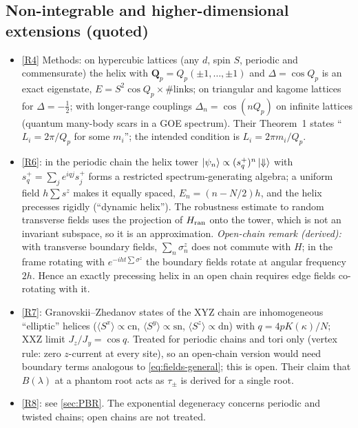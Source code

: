 \documentclass[11pt,a4paper]{article}
\theoremstyle{definition}
\begin{document}
\subsection{Non-integrable and higher-dimensional extensions (quoted)}
\begin{itemize}
\item \ref{R4} Methods: on hypercubic lattices (any $d$, spin $S$, periodic and commensurate) the helix with $\mathbf Q_p=Q_p(\pm1,\dots,\pm1)$ and $\Delta=\cos Q_p$ is an exact eigenstate, $E=S^2\cos Q_p\times\#\text{links}$; on triangular and kagome lattices for $\Delta=-\frac12$; with longer-range couplings $\Delta_n=\cos(nQ_p)$ on infinite lattices (quantum many-body scars in a GOE spectrum). Their Theorem~1 states ``$L_i=2\pi/Q_p$ for some $m_i$''; the intended condition is $L_i=2\pi m_i/Q_p$.
\item \ref{R6}: in the periodic chain the helix tower $\ket{\psi_n}\propto(s_q^+)^n\ket\Downarrow$ with $s^+_q=\sum_je^{iqj}s^+_j$ forms a restricted spectrum-generating algebra; a uniform field $h\sum s^z$ makes it equally spaced, $E_n=(n-N/2)h$, and the helix precesses rigidly (``dynamic helix''). The robustness estimate to random transverse fields uses the projection of $H_{\rm ran}$ onto the tower, which is not an invariant subspace, so it is an approximation. \emph{Open-chain remark (derived):} with transverse boundary fields, $\sum_n\sigma^z_n$ does not commute with $H$; in the frame rotating with $e^{-iht\sum\sigma^z}$ the boundary fields rotate at angular frequency $2h$. Hence an exactly precessing helix in an open chain requires edge fields co-rotating with it.
\item \ref{R7}: Granovskii--Zhedanov states of the XYZ chain are inhomogeneous ``elliptic'' helices ($\langle S^x\rangle\propto\mathrm{cn}$, $\langle S^y\rangle\propto\mathrm{sn}$, $\langle S^z\rangle\propto\mathrm{dn}$) with $q=4pK(\kappa)/N$; XXZ limit $J_z/J_y=\cos q$. Treated for periodic chains and tori only (vertex rule: zero $z$-current at every site), so an open-chain version would need boundary terms analogous to \eqref{eq:fields-general}; this is open. Their claim that $B(\lambda)$ at a phantom root acts as $\tau_\pm$ is derived for a single root.
\item \ref{R8}: see \cref{sec:PBR}. The exponential degeneracy concerns periodic and twisted chains; open chains are not treated.
\end{itemize}
\end{document}
